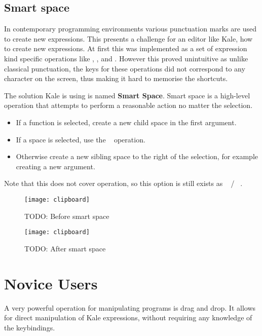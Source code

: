 \subsection{Smart space}
In contemporary programming environments various punctuation marks are used to
create new expressions. This presents a challenge for an editor like Kale, how
to create new expressions. At first this was implemented as a set of
expression kind specific operations like , , and . However this proved unintuitive as
unlike classical punctuation, the keys for these operations did not correspond
to any character on the screen, thus making it hard to memorise the shortcuts.

The solution Kale is using is named \textbf{Smart Space}. Smart space is a
high-level operation that attempts to perform a reasonable action no matter the
selection.
\begin{itemize}[noitemsep]
	\item If a function is selected, create a new child space in the first
argument.
	\item If a space is selected, use the
	\hyperref[cmd:up_down]{}~ operation.
	\item Otherwise create a new sibling space to the right of the selection, for
example creating a new argument.
\end{itemize}

Note that this does not cover  operation, so this option
is still exists as
\hyperref[cmd:new_line]{}~ /
\hyperref[cmd:new_line]{}~.

\begin{figure}
	\begin{minipage}{0.5\linewidth}
	\centering
	\texttt{[image: clipboard]}
	\caption{TODO: Before smart space}
	\end{minipage}
	\qquad
	\begin{minipage}{0.5\linewidth}
	\centering
	\texttt{[image: clipboard]}
	\caption{TODO: After smart space}
	\end{minipage}
\end{figure}

\section{Novice Users}
A very powerful operation for manipulating programs is drag and drop. It allows
for direct manipulation of Kale expressions, without requiring any knowledge of
the keybindings.

